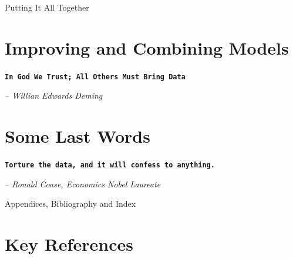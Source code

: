 \documentclass[11pt, letterpaper, twoside]{memoir}\usepackage{knitr}
\makeatletter
\newcommand{\chapterendsymbol}{
    \vspace{24pt}
    \Huge
    \hrulefill \hspace{0.1in} \floweroneleft\floweroneright \hspace{0.1in} \hrulefill
    \normalsize
    }
\renewcommand\part{%
  \if@openright
    \cleardoublepage
  \else
    \clearpage
  \fi
  \thispagestyle{empty}
  \null\vfil
  \secdef\@part\@spart
  }
\makeatother
\begin{document}
\vspace{12pt}

\chapterendsymbol


\part{Putting It All Together}



\chapter{Improving and Combining Models}

\begin{flushright}

\textbf{\texttt{In God We Trust; All Others Must Bring Data}}

\emph{-- Willian Edwards Deming}

\end{flushright}

\vspace{12pt}

\chapterendsymbol




\chapter{Some Last Words}

\begin{flushright}

\textbf{\texttt{Torture the data, and it will confess to anything.}}

\emph{-- Ronald Coase, Economics Nobel Laureate}

\end{flushright}

\vspace{12pt}


\chapterendsymbol

\part{Appendices, Bibliography and Index}

\appendix




\chapter{Key References}
\end{document}
